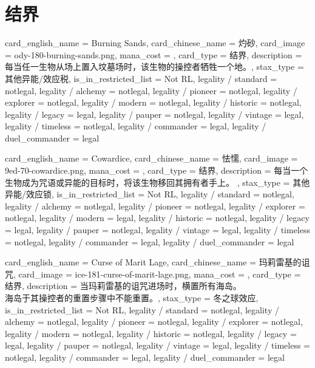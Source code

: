 \documentclass[lang = cn, color = black, 10pt]{AllThatStax}
\begin{document}
\section{结界}

\card
{
	card_english_name = {Burning Sands},
	card_chinese_name = {灼砂},
	card_image = ody-180-burning-sands.png,
	mana_cost = ,
	card_type = 结界,
	description = {每当任一生物从场上置入坟墓场时，该生物的操控者牺牲一个地。},
	stax_type = 其他异能/效应税,
	is_in_restricted_list = Not RL,
	legality / standard = notlegal,
	legality / alchemy = notlegal,
	legality / pioneer = notlegal,
	legality / explorer = notlegal,
	legality / modern = notlegal,
	legality / historic = notlegal,
	legality / legacy = legal,
	legality / pauper = notlegal,
	legality / vintage = legal,
	legality / timeless = notlegal,
	legality / commander = legal,
	legality / duel_commander = legal
}

\card
{
	card_english_name = {Cowardice},
	card_chinese_name = {怯懦},
	card_image = 9ed-70-cowardice.png,
	mana_cost = ,
	card_type = 结界,
	description = {每当一个生物成为咒语或异能的目标时，将该生物移回其拥有者手上。 },
	stax_type = 其他异能/效应锁,
	is_in_restricted_list = Not RL,
	legality / standard = notlegal,
	legality / alchemy = notlegal,
	legality / pioneer = notlegal,
	legality / explorer = notlegal,
	legality / modern = legal,
	legality / historic = notlegal,
	legality / legacy = legal,
	legality / pauper = notlegal,
	legality / vintage = legal,
	legality / timeless = notlegal,
	legality / commander = legal,
	legality / duel_commander = legal
}

\card
{
	card_english_name = {Curse of Marit Lage},
	card_chinese_name = {玛莉雷基的诅咒},
	card_image = ice-181-curse-of-marit-lage.png,
	mana_cost = ,
	card_type = 结界,
	description = {当玛莉雷基的诅咒进场时，横置所有海岛。\\
海岛于其操控者的重置步骤中不能重置。},
	stax_type = 冬之球效应,
	is_in_restricted_list = Not RL,
	legality / standard = notlegal,
	legality / alchemy = notlegal,
	legality / pioneer = notlegal,
	legality / explorer = notlegal,
	legality / modern = notlegal,
	legality / historic = notlegal,
	legality / legacy = legal,
	legality / pauper = notlegal,
	legality / vintage = legal,
	legality / timeless = notlegal,
	legality / commander = legal,
	legality / duel_commander = legal
}
\end{document}
